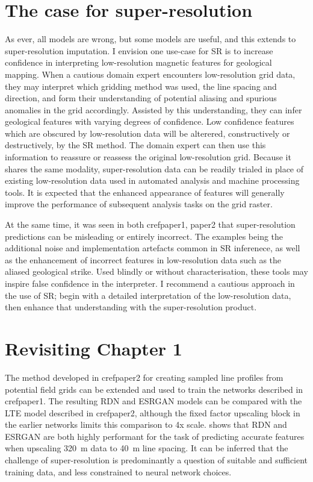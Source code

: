 \documentclass[manuscript.tex]{subfiles}
\begin{document}
\section{The case for super-resolution}
As ever, all models are wrong, but some models are useful, and this extends to super-resolution imputation.
I envision one use-case for SR is to increase confidence in interpreting low-resolution magnetic features for geological mapping. 
When a cautious domain expert encounters low-resolution grid data, they may interpret which gridding method was used, the line spacing and direction, and form their understanding of potential aliasing and spurious anomalies in the grid accordingly.
Assisted by this understanding, they can infer geological features with varying degrees of confidence.
Low confidence features which are obscured by low-resolution data will be alterered, constructively or destructively, by the SR method.
The domain expert can then use this information to reassure or reassess the original low-resolution grid.
Because it shares the same modality, super-resolution data can be readily trialed in place of existing low-resolution data used in automated analysis and machine processing tools.
It is expected that the enhanced appearance of features will generally improve the performance of subsequent analysis tasks on the grid raster.

At the same time, it was seen in both cref{paper1, paper2} that super-resolution predictions can be misleading or entirely incorrect.
The examples being the additional noise and implementation artefacts common in SR inferenece, as well as the enhancement of incorrect features in low-resolution data such as the aliased geological strike.
Used blindly or without characterisation, these tools may inspire false confidence in the interpreter.
I recommend a cautious approach in the use of SR\@; begin with a detailed interpretation of the low-resolution data, then enhance that understanding with the super-resolution product.

\section{Revisiting Chapter 1}
The method developed in cref{paper2} for creating sampled line profiles from potential field grids can be extended and used to train the networks described in cref{paper1}.
The resulting RDN and ESRGAN models can be compared with the LTE model described in cref{paper2}, although the fixed factor upscaling block in the earlier networks limits this comparison to 4x scale.
 shows that RDN and ESRGAN are both highly performant for the task of predicting accurate features when upscaling \SI{320}{\m} data to \SI{40}{\m} line spacing.
It can be inferred that the challenge of super-resolution is predominantly a question of suitable and sufficient training data, and less constrained to neural network choices.
\end{document}
